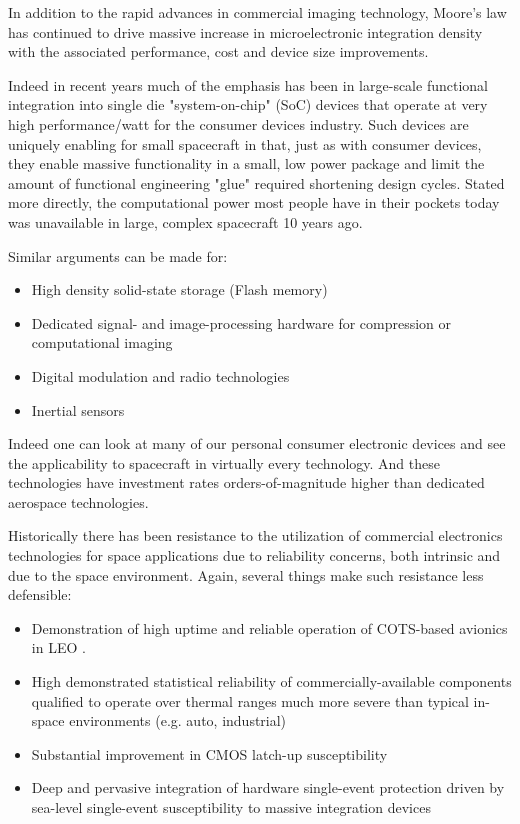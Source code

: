 \documentclass[10pt,journal]{IEEEtran}  %
\begin{document}
In addition to the rapid advances in commercial imaging technology, Moore's law has continued to drive massive increase in microelectronic integration density with the associated performance, cost and device size improvements.

Indeed in recent years much of the emphasis has been in large-scale functional integration into single die "system-on-chip" (SoC) devices that operate at very high performance/watt for the consumer devices industry.  Such devices are uniquely enabling for small spacecraft in that, just as with consumer devices, they enable massive functionality in a small, low power package and limit the amount of functional engineering "glue" required shortening design cycles.  Stated more directly, the computational power most people have in their pockets today was unavailable in large, complex spacecraft 10 years ago.

Similar arguments can be made for:

\begin{itemize}
    \item High density solid-state storage (Flash memory)
    \item Dedicated signal- and image-processing hardware for compression or computational imaging
    \item Digital modulation and radio technologies
    \item Inertial sensors
\end{itemize}

Indeed one can look at many of our personal consumer electronic devices and see the applicability to spacecraft in virtually every technology.  And these technologies have investment rates orders-of-magnitude higher than dedicated aerospace technologies.

Historically there has been resistance to the utilization of commercial electronics technologies for space applications due to reliability concerns, both intrinsic and due to the space environment.  Again, several things make such resistance less defensible:

\begin{itemize}
    \item Demonstration of high uptime and reliable operation of COTS-based avionics in LEO \cite{careful_cost}.
    \item High demonstrated statistical reliability of commercially-available components qualified to operate over thermal ranges much more severe than typical in-space environments (e.g. auto, industrial)
    \item Substantial improvement in CMOS latch-up susceptibility
    \item Deep and pervasive integration of hardware single-event protection driven by sea-level single-event susceptibility to massive integration devices
\end{itemize}
\end{document}
